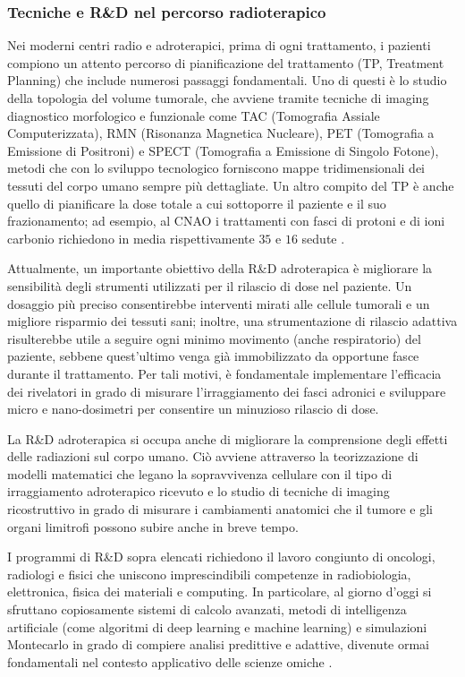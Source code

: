\documentclass[12pt,a4paper,twoside]{report}
\begin{document}
	\subsubsection{Tecniche e R\&D nel percorso radioterapico}
	Nei moderni centri radio e adroterapici, prima di ogni trattamento, i pazienti compiono un attento percorso di pianificazione del trattamento (TP, Treatment Planning) che include numerosi passaggi fondamentali. Uno di questi è lo studio della topologia del volume tumorale, che avviene tramite tecniche di imaging diagnostico morfologico e funzionale come TAC (Tomografia Assiale Computerizzata), RMN (Risonanza Magnetica Nucleare), PET (Tomografia a Emissione di Positroni) e SPECT (Tomografia a Emissione di Singolo Fotone), metodi che con lo sviluppo tecnologico forniscono mappe tridimensionali dei tessuti del corpo umano sempre più dettagliate. Un altro compito del TP è anche quello di pianificare la dose totale a cui sottoporre il paziente e il suo frazionamento; ad esempio, al CNAO i trattamenti con fasci di protoni e di ioni carbonio richiedono in media rispettivamente $35$ e $16$ sedute \cite{cnao7}.
	
	Attualmente, un importante obiettivo della R\&D adroterapica è migliorare la sensibilità degli strumenti utilizzati per il rilascio di dose nel paziente. Un dosaggio più preciso consentirebbe interventi mirati alle cellule tumorali e un migliore risparmio dei tessuti sani; inoltre, una strumentazione di rilascio adattiva risulterebbe utile a seguire ogni minimo movimento (anche respiratorio) del paziente, sebbene quest'ultimo venga già immobilizzato da opportune fasce durante il trattamento. Per tali motivi, è fondamentale implementare l'efficacia dei rivelatori in grado di misurare l'irraggiamento dei fasci adronici e sviluppare micro e nano-dosimetri per consentire un minuzioso rilascio di dose.
	
	La R\&D adroterapica si occupa anche di migliorare la comprensione degli effetti delle radiazioni sul corpo umano. Ciò avviene attraverso la teorizzazione di modelli matematici che legano la sopravvivenza cellulare con il tipo di irraggiamento adroterapico ricevuto e lo studio di tecniche di imaging ricostruttivo in grado di misurare i cambiamenti anatomici che il tumore e gli organi limitrofi possono subire anche in breve tempo.
	
	I programmi di R\&D sopra elencati richiedono il lavoro congiunto di oncologi, radiologi e fisici che uniscono imprescindibili competenze in radiobiologia, elettronica, fisica dei materiali e computing. In particolare, al giorno d'oggi si sfruttano copiosamente sistemi di calcolo avanzati, metodi di intelligenza artificiale (come algoritmi di deep learning e machine learning) e simulazioni Montecarlo in grado di compiere analisi predittive e adattive, divenute ormai fondamentali nel contesto applicativo delle scienze omiche \cite{asimmetrie_curareCLP,asimmetrie_DLAS,asimmetrie_curareGD}.
	
\end{document}
